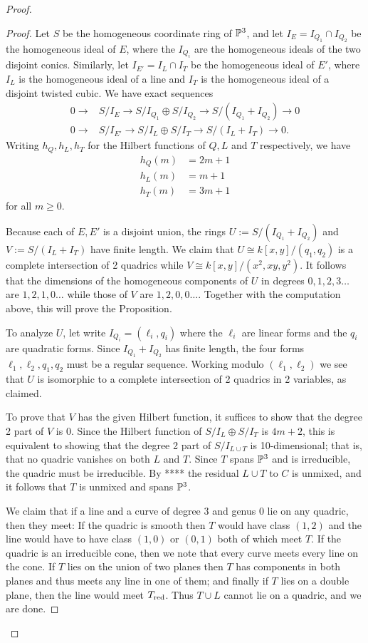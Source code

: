 \begin{proof}
\begin{proof} 
Let $S$ be the homogeneous coordinate ring of $\PP^3$, and let
$I_E = I_{Q_1}\cap I_{Q_2}$ be the homogeneous ideal of $E$, where the $I_{Q_i}$ are the homogeneous
ideals of the two disjoint conics. Similarly, let $I_{E'} = I_L\cap I_T$ be the
homogeneous ideal of $E'$, where $I_L$ is the homogeneous ideal of a line and $I_T$ is the homogeneous ideal
of a disjoint twisted cubic. We have exact sequences
\begin{align*}
0\to &S/I_E \to S/I_{Q_1} \oplus S/I_{Q_2} \to S/(I_{Q_1}+I_{Q_2})\to 0\\
0\to &S/I_{E'} \to S/I_L \oplus S/I_T \to S/(I_L+I_T)\to 0.
\end{align*}
Writing $h_Q, h_L,h_T$ for the Hilbert functions of $Q,L$ and $T$ respectively, we have
\begin{align*}
h_Q(m) &= 2m+1\\
h_L(m) &= m+1\\
h_T(m) &=3m+1 
\end{align*}
for all $m\geq 0$. 

Because each of $E,E'$ is a disjoint union, the rings $U := S/(I_{Q_1}+I_{Q_2})$ and $V := S/(I_L+I_T)$
have finite length. We claim that $U \cong k[x,y]/(q_1,q_2)$ is a complete intersection of 2 quadrics while
$V \cong k[x,y]/(x^2,xy,y^2)$. It follows that the dimensions of the homogeneous components of 
$U$ in degrees $0,1,2,3\dots$ are $1,2,1,0\dots$ while those of $V$ are $1,2,0,0\dots$. Together
with the computation above, this will prove the Proposition.

To analyze $U$, let write $I_{Q_i} = (\ell_i, q_i)$ where the $\ell_i$ are linear forms and the $q_i$ are 
quadratic forms. Since $I_{Q_1} +I_{Q_2}$ has finite length, the four forms
$\ell_1,\ell_2,q_1,q_2$ must be a regular sequence. Working modulo $(\ell_1,\ell_2)$ we see that 
$U$ is isomorphic to a complete intersection of 2 quadrics in 2 variables, as claimed.

To prove that $V$ has the given Hilbert function, it suffices to show that the degree 2 part of $V$ is 0. Since the Hilbert function of $S/I_L \oplus S/I_T$ is $4m+2$, this is equivalent to showing that the degree 2 part of
$S/I_{L\cup T}$ is 10-dimensional; that is, that no quadric vanishes on
both $L$ and $T$. Since $T$ spans $\PP^3$ and is irreducible, the quadric must be irreducible. By ****
the residual $L\cup T$ to $C$ is unmixed, and it follows that $T$ is unmixed and spans $\PP^{3}$. 

We claim that if a line and a curve of degree 3 and genus 0 lie on any quadric, then they meet: If the quadric is smooth then $T$ would have class $(1,2)$ and the line would have to have class $(1,0)$ or
$(0,1)$ both of which meet $T$. If the quadric is an irreducible cone, then we note that  every curve meets every line on the cone. If $T$ lies on the union of two planes then $T$ has components in both planes and thus meets any line in one of them; and finally if $T$ lies on a double plane, then the line would meet $T_{\rm red}$. Thus
$T\cup L$ cannot lie on a quadric, and we are done.
\end{proof}



\end{proof}
